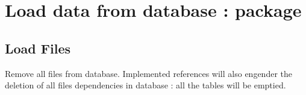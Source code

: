 \documentclass[letterpaper,10pt,english]{sphinxmanual}
\begin{document}
\begin{fulllineitems}
\begin{sphinxVerbatim}[commandchars=\\\{\}]
\end{sphinxVerbatim}

\end{fulllineitems}



\chapter{Load data from database :  package}
\label{\detokenize{load:load-data-from-database-load-package}}\label{\detokenize{load::doc}}

\section{Load Files}
\label{\detokenize{load:module-loacore.load.file_load}}\label{\detokenize{load:load-files}}

\begin{fulllineitems}
\label{\detokenize{load:loacore.load.file_load.clean_db}}
Remove all files from database. Implemented references will also engender the deletion of all files
dependencies in database : all the tables will be emptied.

\end{fulllineitems}

\end{document}
